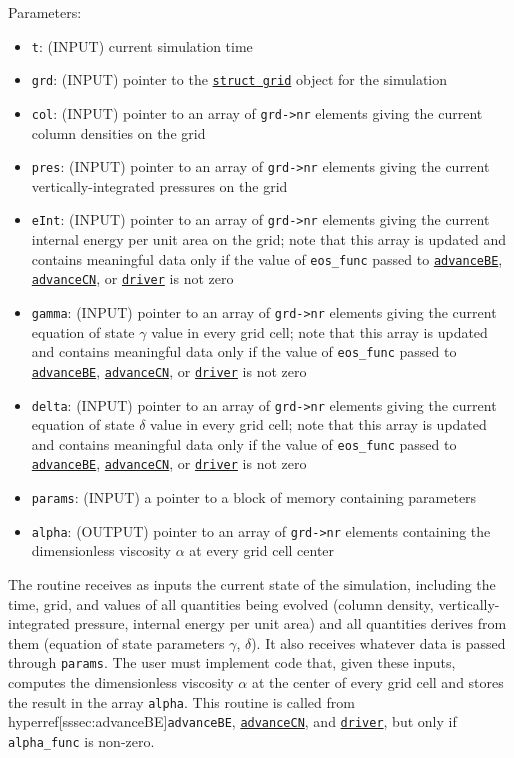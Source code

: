 \documentclass[12pt]{article}
\begin{document}
Parameters:
\begin{itemize}
\item \texttt{t}: (INPUT) current simulation time
\item \texttt{grd}: (INPUT) pointer to the \hyperref[sssec:datastructures]{\texttt{struct grid}} object for the simulation
\item \texttt{col}: (INPUT) pointer to an array of \texttt{grd->nr} elements giving the current column densities on the grid
\item \texttt{pres}: (INPUT) pointer to an array of \texttt{grd->nr} elements giving the current vertically-integrated pressures on the grid
\item \texttt{eInt}: (INPUT) pointer to an array of \texttt{grd->nr} elements giving the current internal energy per unit area on the grid; note that this array is updated and contains meaningful data only if the value of \verb=eos_func= passed to \hyperref[sssec:advanceBE]{\texttt{advanceBE}}, \hyperref[sssec:advanceCN]{\texttt{advanceCN}}, or \hyperref[sssec:driver]{\texttt{driver}} is not zero
\item \texttt{gamma}: (INPUT) pointer to an array of \texttt{grd->nr} elements giving the current equation of state $\gamma$ value in every grid cell; note that this array is updated and contains meaningful data only if the value of \verb=eos_func= passed to \hyperref[sssec:advanceBE]{\texttt{advanceBE}}, \hyperref[sssec:advanceCN]{\texttt{advanceCN}}, or \hyperref[sssec:driver]{\texttt{driver}} is not zero
\item \texttt{delta}: (INPUT) pointer to an array of \texttt{grd->nr} elements giving the current equation of state $\delta$ value in every grid cell; note that this array is updated and contains meaningful data only if the value of \verb=eos_func= passed to \hyperref[sssec:advanceBE]{\texttt{advanceBE}}, \hyperref[sssec:advanceCN]{\texttt{advanceCN}}, or \hyperref[sssec:driver]{\texttt{driver}} is not zero
\item \texttt{params}: (INPUT) a pointer to a block of memory containing parameters
\item \texttt{alpha}: (OUTPUT) pointer to an array of \texttt{grd->nr} elements containing the dimensionless viscosity $\alpha$ at every grid cell center
\end{itemize}

The routine receives as inputs the current state of the simulation, including the time, grid, and values of all quantities being evolved (column density, vertically-integrated pressure, internal energy per unit area) and all quantities derives from them (equation of state parameters $\gamma$, $\delta$). It also receives whatever data is passed through \verb=params=. The user must implement code that, given these inputs, computes the dimensionless viscosity $\alpha$ at the center of every grid cell and stores the result in the array \verb=alpha=. This routine is called from hyperref[sssec:advanceBE]{\texttt{advanceBE}}, \hyperref[sssec:advanceCN]{\texttt{advanceCN}}, and \hyperref[sssec:driver]{\texttt{driver}}, but only if \verb=alpha_func= is non-zero.
\end{document}
